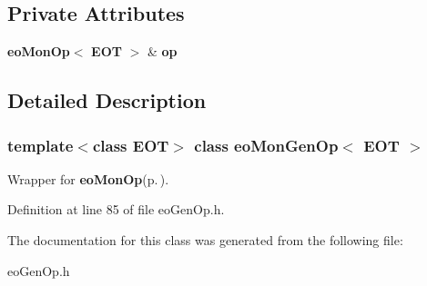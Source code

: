 \subsection*{Private Attributes}
\begin{CompactItemize}
\item 
{\bf eo\-Mon\-Op}$<$ {\bf EOT} $>$ \& {\bf op}\label{classeo_mon_gen_op_r0}

\end{CompactItemize}


\subsection{Detailed Description}
\subsubsection*{template$<$class EOT$>$ class eo\-Mon\-Gen\-Op$<$ EOT $>$}

Wrapper for {\bf eo\-Mon\-Op}{\rm (p.\,\pageref{classeo_mon_op})}. 



Definition at line 85 of file eo\-Gen\-Op.h.

The documentation for this class was generated from the following file:\begin{CompactItemize}
\item 
eo\-Gen\-Op.h\end{CompactItemize}
